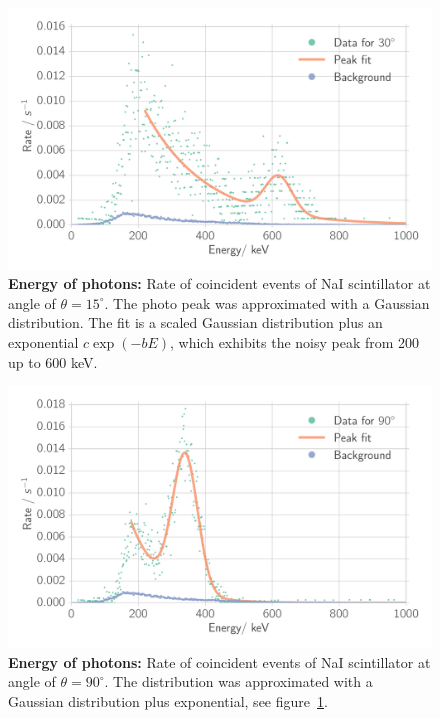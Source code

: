 \begin{figure}[htpb]
    \centering
    \includegraphics[width=0.9\linewidth]{./analysis/figures/coin_na_30}
    \caption{\textbf{Energy of photons:} Rate of coincident events of 
        NaI scintillator at angle of $\theta = 15^\circ$. The photo peak was approximated
    with a Gaussian distribution. The fit is a scaled Gaussian distribution plus an exponential $c \exp(-b E)$, which
    exhibits the noisy peak from 200 up to 600 keV.}
\label{fig:coin_na_30}
\end{figure}




\begin{figure}[htpb]
    \centering
    \includegraphics[width=0.9\linewidth]{./analysis/figures/coin_na_90}
\caption{\textbf{Energy of photons:} Rate of coincident events of 
        NaI scintillator at angle of $\theta = 90^\circ$. The distribution 
    was approximated with a Gaussian distribution plus exponential, see figure~\ref{fig:coin_na_30}. }
\label{fig:coin_na_90}
\end{figure}


